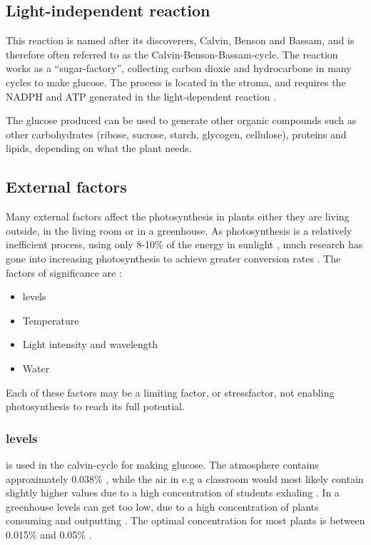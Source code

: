 \subsection{Light-independent reaction}
This reaction is named after its discoverers, Calvin, Benson and Bassam, and is therefore often referred to as the Calvin-Benson-Bassam-cycle. The reaction works as a “sugar-factory”, collecting carbon dioxie and hydrocarbone in many cycles to make glucose. The process is located in the stroma, and requires the NADPH and ATP generated in the light-dependent reaction \citep{bi2}. 

The glucose produced can be used to generate other organic compounds such as other carbohydrates (ribose, sucrose, starch, glycogen, cellulose), proteins and lipids, depending on what the plant needs.

\subsection{External factors}
Many external factors affect the photosynthesis in plants either they are living outside, in the living room or in a greenhouse. As photosynthesis is a relatively inefficient process, using only 8-10\% of the energy in sunlight \citetext{Long et. al, 2006; Zhu et. al, 2010, referenced in \citealp{kirschbaum2011does}}, much research has gone into increasing photosynthesis to achieve greater conversion rates \citetext{Reynolds et al., 2000; Sinclair et al., 2004; Long et al., 2006; Zhu et al., 2010, referenced in \citealp{kirschbaum2011does}}. The factors of significance are \citep{bios}:
\begin{itemize}
\item {} levels
\item Temperature
\item Light intensity and wavelength
\item Water
\end{itemize}
Each of these factors may be a limiting factor, or stressfactor, not enabling photosynthesis to reach its full potential. 

\subsubsection{ levels}
 is used in the calvin-cycle for making glucose. The atmosphere contains approximately 0.038\% , while the air in e.g a classroom would most likely contain slightly higher values due to a high concentration of students exhaling . In a greenhouse  levels can get too low, due to a high concentration of plants consuming  and outputting . The optimal concentration for most plants is between 0.015\% and 0.05\% \citep{bios}. 


